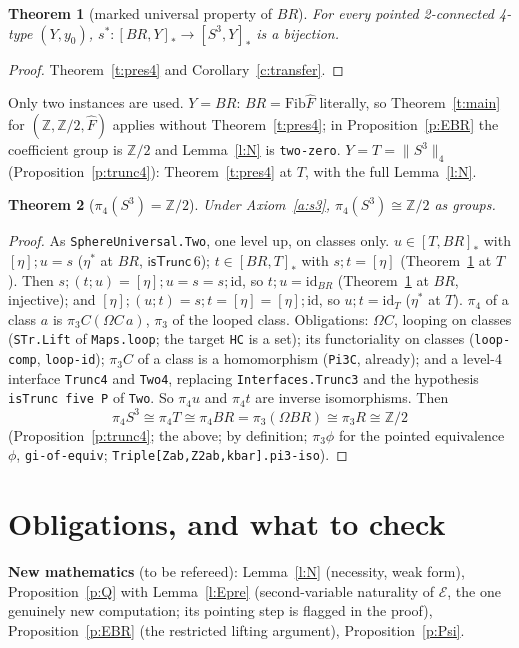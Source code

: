 \documentclass[11pt]{amsart}
\newtheorem{theorem}{Theorem}
\theoremstyle{definition}
\theoremstyle{remark}
\newcommand{\Om}{\Omega}
\newcommand{\Z}{\mathbb{Z}}
\newcommand{\code}[1]{\texttt{#1}}
\newcommand{\cT}{\mathsf{isTrunc}}
\newcommand{\lp}{\Omega}
\newcommand{\hc}[2]{[#1,#2]_*}
\newcommand{\Fib}{\mathrm{Fib}}
\newcommand{\tr}[1]{\|#1\|}
\newcommand{\cls}[1]{[#1]}
\newcommand{\Fh}{\hat F}
\newcommand{\cE}{\mathcal E}
\begin{document}
\begin{theorem}[marked universal property of $BR$]\label{t:up}
For every pointed 2-connected 4-type $(Y,y_0)$, $s^*:\hc{BR}Y\to\hc{S^3}Y$ is a
bijection.
\end{theorem}
\begin{proof}
Theorem~\ref{t:pres4} and Corollary~\ref{c:transfer}.
\end{proof}

\noindent Only two instances are used. $Y=BR$: $BR=\Fib\Fh$ literally, so
Theorem~\ref{t:main} for $(\Z,\Z/2,\Fh)$ applies without Theorem~\ref{t:pres4};
in Proposition~\ref{p:EBR} the coefficient group is $\Z/2$ and Lemma~\ref{l:N} is
\code{two-zero}. $Y=T=\tr{S^3}_4$ (Proposition~\ref{p:trunc4}): Theorem~\ref{t:pres4} at
$T$, with the full Lemma~\ref{l:N}.

\begin{theorem}[$\pi_4(S^3)=\Z/2$]\label{t:final}
Under Axiom~\ref{a:s3}, $\pi_4(S^3)\cong\Z/2$ as groups.
\end{theorem}
\begin{proof}
As \code{SphereUniversal.Two}, one level up, on classes only. $u\in\hc T{BR}$
with $\cls\eta;u=s$ ($\eta^*$ at $BR$, $\cT\,6$); $t\in\hc{BR}T$ with
$s;t=\cls\eta$ (Theorem~\ref{t:up} at $T$). Then $s;(t;u)=\cls\eta;u=s=s;\mathrm{id}$,
so $t;u=\mathrm{id}_{BR}$ (Theorem~\ref{t:up} at $BR$, injective); and
$\cls\eta;(u;t)=s;t=\cls\eta=\cls\eta;\mathrm{id}$, so $u;t=\mathrm{id}_T$ ($\eta^*$ at
$T$). $\pi_4$ of a class $a$ is $\pi_3C(\lp C\,a)$, $\pi_3$ of the looped class. Obligations:
$\lp C$, looping on classes (\code{STr.Lift} of \code{Maps.loop}; the target \code{HC} is a
set); its functoriality on classes (\code{loop-comp}, \code{loop-id}); $\pi_3C$ of a class is a
homomorphism (\code{Pi3C}, already); and a level-4 interface \code{Trunc4} and \code{Two4},
replacing \code{Interfaces.Trunc3} and the hypothesis \code{isTrunc five P} of \code{Two}. So $\pi_4u$ and $\pi_4t$ are inverse isomorphisms. Then
\[\pi_4S^3\cong\pi_4T\cong\pi_4BR=\pi_3(\Om BR)\cong\pi_3R\cong\Z/2\]
(Proposition~\ref{p:trunc4}; the above; by definition; $\pi_3\phi$ for the pointed
equivalence $\phi$, \code{gi-of-equiv}; \code{Triple[Zab,Z2ab,kbar].pi3-iso}).
\end{proof}

\section{Obligations, and what to check}

\noindent\textbf{New mathematics} (to be refereed): Lemma~\ref{l:N} (necessity,
weak form), Proposition~\ref{p:Q} with Lemma~\ref{l:Epre} (second-variable
naturality of $\cE$, the one genuinely new computation; its pointing step is
flagged in the proof), Proposition~\ref{p:EBR} (the restricted lifting
argument), Proposition~\ref{p:Psi}.
\end{document}
